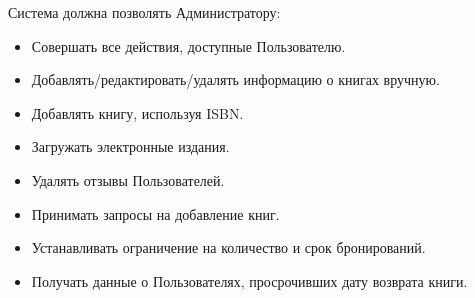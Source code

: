 \documentclass[../Отчет.tex]{subfiles}
\begin{document}
\par
Система должна позволять Администратору:
\begin{itemize}
    \item Совершать все действия, доступные Пользователю.
    \item Добавлять/редактировать/удалять информацию о книгах вручную.
    \item Добавлять книгу, используя ISBN.
    \item Загружать электронные издания.
    \item Удалять отзывы Пользователей.
    \item Принимать запросы на добавление книг.
    \item Устанавливать ограничение на количество и срок бронирований.
    \item Получать данные о Пользователях, просрочивших дату возврата книги.
\end{itemize}
\clearpage
\end{document}

